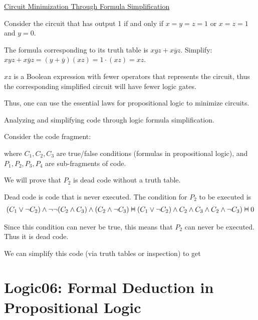 \documentclass{article}
\newcommand{\vDashv}{%
  \mathrel{%
    \text{%
      \ooalign{$\vDash$\cr\reflectbox{$\vDash$}\cr}%
    }%
  }%
}
\begin{document}
\underline{Circuit Minimization Through Formula Simplification}

Consider the circuit that has output 1 if and only if $x = y = z = 1$ or $x = z = 1$ and $y = 0$.

The formula corresponding to its truth table is $xyz + x\overline{y}z$. Simplify: $xyz + x\overline{y}z = (y + \overline{y})(xz) = 1 \cdot (xz) = xz$.

$xz$ is a Boolean expression with fewer operators that represents the circuit, thus the corresponding simplified circuit will have fewer logic gates.

Thus, one can use the essential laws for propositional logic to minimize circuits. 


Analyzing and simplifying code through logic formula simplification. 

Consider the code fragment:

\begin{algorithm}[H]
\end{algorithm}

where $C_1, C_2, C_3$ are true/false conditions (formulas in propositional logic), and $P_1, P_2, P_3, P_4$ are sub-fragments of code.

We will prove that $P_2$ is dead code without a truth table.

Dead code is code that is never executed. The condition for $P_2$ to be executed is
\begin{align*}
(C_1 \vee \neg C_2) \wedge \neg \neg(C_2 \wedge C_3) \wedge (C_2 \wedge \neg C_3) \vDashv (C_1 \vee \neg C_2) \wedge C_2 \wedge C_3 \wedge C_2 \wedge \neg C_3) \vDashv 0
\end{align*}

Since this condition can never be true, this means that $P_2$ can never be executed. Thus it is dead code. 

We can simplify this code (via truth tables or inspection) to get

\begin{algorithm}[H]
\end{algorithm}

\section{Logic06: Formal Deduction in Propositional Logic}
\end{document}
